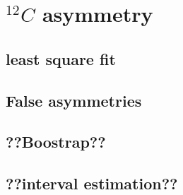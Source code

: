 \section{ $^{12}C$ asymmetry}

\subsection{least square fit}

\subsection{False asymmetries}

\subsection{??Boostrap??}

\subsection{??interval estimation??}





